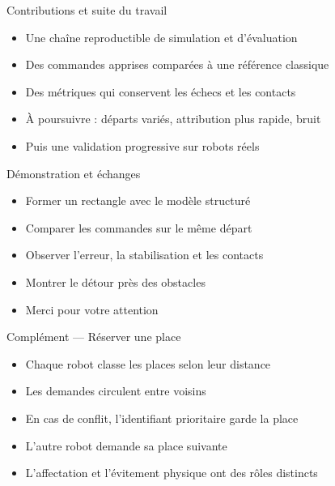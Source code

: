 \documentclass[aspectratio=169,11pt]{beamer}
\begin{document}
\begin{frame}{Contributions et suite du travail}
\begin{itemize}\setlength{\itemsep}{4mm}
\item Une chaîne reproductible de simulation et d’évaluation
\item Des commandes apprises comparées à une référence classique
\item Des métriques qui conservent les échecs et les contacts
\item À poursuivre : départs variés, attribution plus rapide, bruit
\item Puis une validation progressive sur robots réels
\end{itemize}
\end{frame}

\begin{frame}{Démonstration et échanges}
\begin{itemize}\setlength{\itemsep}{4mm}
\item Former un rectangle avec le modèle structuré
\item Comparer les commandes sur le même départ
\item Observer l’erreur, la stabilisation et les contacts
\item Montrer le détour près des obstacles
\item Merci pour votre attention
\end{itemize}
\end{frame}

\begin{frame}{Complément — Réserver une place}
\begin{itemize}\setlength{\itemsep}{4mm}
\item Chaque robot classe les places selon leur distance
\item Les demandes circulent entre voisins
\item En cas de conflit, l’identifiant prioritaire garde la place
\item L’autre robot demande sa place suivante
\item L’affectation et l’évitement physique ont des rôles distincts
\end{itemize}
\end{frame}
\end{document}

